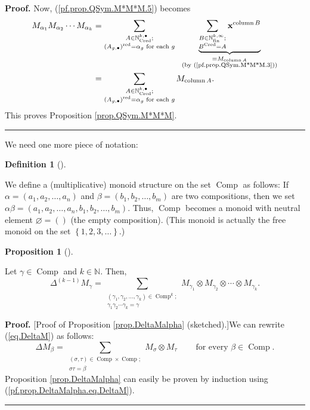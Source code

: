 \documentclass[numbers=enddot,12pt,final,onecolumn,notitlepage,abstracton]{scrartcl}%
\theoremstyle{definition}
\newtheorem{prop}[theo]{Proposition}
\newenvironment{proposition}[1][]
{\begin{prop}[#1]\begin{leftbar}}
{\end{leftbar}\end{prop}}
\newtheorem{defi}[theo]{Definition}
\newenvironment{definition}[1][]
{\begin{defi}[#1]\begin{leftbar}}
{\end{leftbar}\end{defi}}
\newenvironment{proof}[1][Proof]{\noindent\textbf{#1.} }{\ \rule{0.5em}{0.5em}}
\let\sumnonlimits\sum
\renewcommand{\sum}{\sumnonlimits\limits}
\begin{document}
\begin{proof}
Now, (\ref{pf.prop.QSym.M*M*M.5}) becomes%
\begin{align*}
M_{\alpha_{1}}M_{\alpha_{2}}\cdots M_{\alpha_{k}}  &  =\sum_{\substack{A\in
\mathbb{N}_{\operatorname*{Cred}}^{k,\bullet};\\\left(  A_{g,\bullet}\right)
^{\operatorname*{red}}=\alpha_{g}\text{ for each }g}}\ \ \underbrace{\sum
_{\substack{B\in\mathbb{N}_{\operatorname*{fin}}^{k,\infty}%
;\\B^{\operatorname*{Cred}}=A}}\mathbf{x}^{\operatorname*{column}B}%
}_{\substack{=M_{\operatorname*{column}A}\\\text{(by
(\ref{pf.prop.QSym.M*M*M.3}))}}}\\
&  =\sum_{\substack{A\in\mathbb{N}_{\operatorname*{Cred}}^{k,\bullet
};\\\left(  A_{g,\bullet}\right)  ^{\operatorname*{red}}=\alpha_{g}\text{ for
each }g}}M_{\operatorname*{column}A}.
\end{align*}
This proves Proposition \ref{prop.QSym.M*M*M}.
\end{proof}

We need one more piece of notation:

\begin{definition}
\label{def.Comp.monoid}We define a (multiplicative) monoid structure on the
set $\operatorname*{Comp}$ as follows: If $\alpha=\left(  a_{1},a_{2}%
,\ldots,a_{n}\right)  $ and $\beta=\left(  b_{1},b_{2},\ldots,b_{m}\right)  $
are two compositions, then we set $\alpha\beta=\left(  a_{1},a_{2}%
,\ldots,a_{n},b_{1},b_{2},\ldots,b_{m}\right)  $. Thus, $\operatorname*{Comp}$
becomes a monoid with neutral element $\varnothing=\left(  {}\right)  $ (the
empty composition). (This monoid is actually the free monoid on the set
$\left\{  1,2,3,\ldots\right\}  $.)
\end{definition}

\begin{proposition}
\label{prop.DeltaMalpha}Let $\gamma\in\operatorname*{Comp}$ and $k\in
\mathbb{N}$. Then,%
\[
\Delta^{\left(  k-1\right)  }M_{\gamma}=\sum_{\substack{\left(  \gamma
_{1},\gamma_{2},\ldots,\gamma_{k}\right)  \in\operatorname*{Comp}%
\nolimits^{k};\\\gamma_{1}\gamma_{2}\cdots\gamma_{k}=\gamma}}M_{\gamma_{1}%
}\otimes M_{\gamma_{2}}\otimes\cdots\otimes M_{\gamma_{k}}.
\]

\end{proposition}

\begin{proof}
[Proof of Proposition \ref{prop.DeltaMalpha} (sketched).]We can rewrite
(\ref{eq.DeltaM}) as follows:%
\begin{equation}
\Delta M_{\beta}=\sum_{\substack{\left(  \sigma,\tau\right)  \in
\operatorname*{Comp}\times\operatorname*{Comp};\\\sigma\tau=\beta}}M_{\sigma
}\otimes M_{\tau}\ \ \ \ \ \ \ \ \ \ \text{for every }\beta\in
\operatorname*{Comp}. \label{pf.prop.DeltaMalpha.eq.DeltaM}%
\end{equation}
Proposition \ref{prop.DeltaMalpha} can easily be proven by induction using
(\ref{pf.prop.DeltaMalpha.eq.DeltaM}).
\end{proof}
\end{document}
